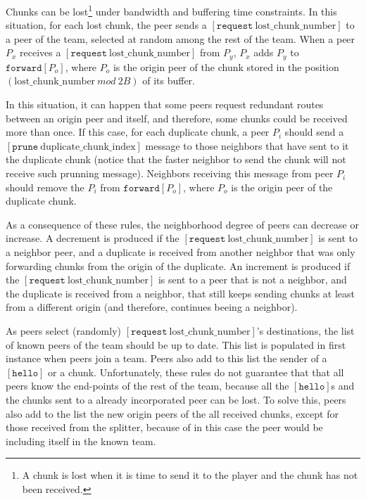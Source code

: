 

\label{sec:routes_discovery}

Chunks can be lost\footnote{A chunk is lost when it is time to send it
  to the player and the chunk has not been received.} under bandwidth
and buffering time constraints.  In this situation, for each lost
chunk, the peer sends a
$[\mathtt{request}~\text{lost\_chunk\_number}]$ to a peer of the team,
selected at random among the rest of the team. When a peer $P_x$
receives a $[\mathtt{request}~\text{lost\_chunk\_number}]$ from $P_y$,
$P_x$ adds $P_y$ to $\mathtt{forward}[P_o]$, where $P_o$ is the origin
peer of the chunk stored in the position
$(\text{lost\_chunk\_number}~\mathit{mod}~2B)$ of its buffer.

In this situation, it can happen that some peers request redundant
routes between an origin peer and itself, and therefore, some chunks
could be received more than once. If this case, for each duplicate
chunk, a peer $P_i$ should send a
$[\mathtt{prune}~\text{duplicate\_chunk\_index}]$ message to those
neighbors that have sent to it the duplicate chunk (notice that the
faster neighbor to send the chunk will not receive such prunning
message). Neighbors receiving this message from peer $P_i$ should
remove the $P_i$ from $\mathtt{forward}[P_o]$, where $P_o$ is the
origin peer of the duplicate chunk.

As a consequence of these rules, the neighborhood degree of peers can
decrease or increase. A decrement is produced if the
$[\mathtt{request}~\text{lost\_chunk\_number}]$ is sent to a neighbor
peer, and a duplicate is received from another neighbor that was only
forwarding chunks from the origin of the duplicate. An increment is
produced if the $[\mathtt{request}~\text{lost\_chunk\_number}]$ is
sent to a peer that is not a neighbor, and the duplicate is received
from a neighbor, that still keeps sending chunks at least from a
different origin (and therefore, continues beeing a neighbor).

As peers select (randomly)
$[\mathtt{request}~\text{lost\_chunk\_number}]$'s destinations, the
list of known peers of the team should be up to date. This list is
populated in first instance when peers join a team. Peers also add to
this list the sender of a $[\mathtt{hello}]$ or a
chunk. Unfortunately, these rules do not guarantee that that all peers
know the end-points of the rest of the team, because all the
$[\mathtt{hello}]$s and the chunks sent to a already incorporated peer
can be lost. To solve this, peers also add to the list the new origin
peers of the all received chunks, except for those received from the
splitter, because of in this case the peer would be including itself
in the known team.

